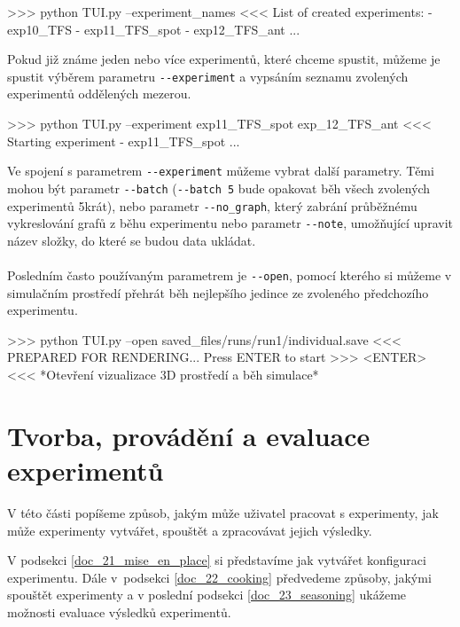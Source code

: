 \begin{code}
>>> python TUI.py --experiment_names
<<< List of created experiments:
     - exp10_TFS
     - exp11_TFS_spot
     - exp12_TFS_ant
     ...
\end{code}

Pokud již známe jeden nebo více experimentů, které chceme spustit,
můžeme je spustit výběrem parametru \texttt{-{}-experiment} a vypsáním seznamu 
zvolených experimentů oddělených mezerou.

\begin{code}
>>> python TUI.py --experiment exp11_TFS_spot exp_12_TFS_ant
<<< Starting experiment - exp11_TFS_spot 
    ...
\end{code}

Ve spojení s parametrem \texttt{-{}-experiment} můžeme vybrat další parametry.
Těmi mohou být parametr \texttt{-{}-batch} (\texttt{-{}-batch 5} bude
opakovat běh všech zvolených experimentů 5krát), nebo parametr
\texttt{-{}-no\_graph}, který zabrání průběžnému vykreslování grafů z běhu
experimentu nebo parametr \texttt{-{}-note}, umožňující upravit název složky,
do které se budou data ukládat.

\paragraph{}
Posledním často používaným parametrem je \texttt{-{}-open}, pomocí kterého
si můžeme v simulačním prostředí přehrát běh nejlepšího jedince ze zvoleného
předchozího experimentu.
\begin{code}
>>> python TUI.py --open saved_files/runs/run1/individual.save
<<< PREPARED FOR RENDERING... Press ENTER to start
>>> <ENTER>
<<< *Otevření vizualizace 3D prostředí a běh simulace*
\end{code}

\section{Tvorba, provádění a evaluace experimentů} \label{doc_2_experimenty}

V této části popíšeme způsob, jakým může uživatel pracovat s experimenty, jak
může experimenty vytvářet, spouštět a zpracovávat jejich výsledky.

V podsekci \ref{doc_21_mise_en_place} si představíme jak vytvářet
konfiguraci experimentu. Dále v~podsekci \ref{doc_22_cooking} předvedeme
způsoby, jakými spouštět experimenty a v poslední podsekci
\ref{doc_23_seasoning} ukážeme možnosti evaluace výsledků experimentů.


